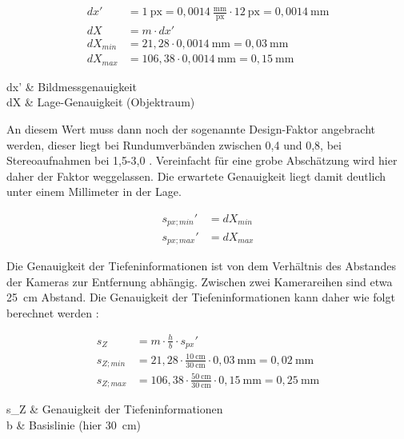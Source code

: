 \documentclass[./00PhotoBox.tex]{subfiles}
\begin{document}
\begin{align}
    dx'      & = 1~\text{px} = 0,0014~\frac{\text{mm}}{\text{px}} \cdot 12~\text{px} = 0,0014~\text{mm} \\
    dX       & = m \cdot dx'                                                                            \\
    dX_{min} & = 21,28 \cdot 0,0014~\text{mm} = 0,03~\text{mm}                                          \\
    dX_{max} & = 106,38 \cdot 0,0014~\text{mm} = 0,15~\text{mm}
\end{align}
\begin{conditions}
    dx' & Bildmessgenauigkeit \\
    dX  & Lage-Genauigkeit (Objektraum)
\end{conditions}

An diesem Wert muss dann noch der sogenannte Design-Faktor  angebracht werden, dieser liegt bei Rundumverbänden zwischen 0,4 und 0,8, bei Stereoaufnahmen bei 1,5-3,0 \citep[S. 174]{luhmann}. Vereinfacht für eine grobe Abschätzung wird hier daher der Faktor weggelassen. Die erwartete Genauigkeit liegt damit deutlich unter einem Millimeter in der Lage.

\begin{align}
    s_{px; min}' & = dX_{min} \\
    s_{px; max}' & = dX_{max}
\end{align}

Die Genauigkeit der Tiefeninformationen ist von dem Verhältnis des Abstandes der Kameras zur Entfernung abhängig. Zwischen zwei Kamerareihen sind etwa 25~cm Abstand. Die Genauigkeit der Tiefeninformationen kann daher wie folgt berechnet werden \citep[S. 174]{luhmann}:

\begin{align}
    s_Z       & = m \cdot \frac{h}{b} \cdot s_{px}'                                                    \\
    s_{Z;min} & = 21,28 \cdot \frac{10~\text{cm}}{30~\text{cm}}\cdot 0,03~\text{mm}  = 0,02~\text{mm}  \\
    s_{Z;max} & = 106,38 \cdot \frac{50~\text{cm}}{30~\text{cm}} \cdot 0,15~\text{mm} = 0,25~\text{mm}
\end{align}
\begin{conditions}
    s_Z & Genauigkeit der Tiefeninformationen \\
    b   & Basislinie (hier 30~cm)
\end{conditions}
\end{document}
